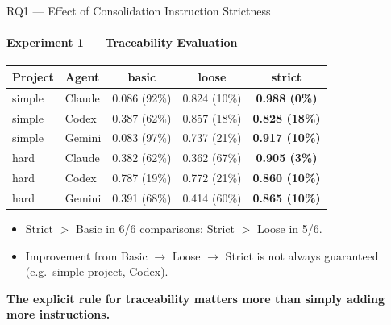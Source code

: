 \documentclass[aspectratio=169,11pt,c]{beamer}
\begin{document}
\begin{frame}{RQ1 --- Effect of Consolidation Instruction Strictness}
  \framesubtitle{Experiment 1 --- Traceability Evaluation}
  \begin{center}\scriptsize
  \begin{tabular}{llccc}
    \toprule
    \textbf{Project} & \textbf{Agent} & \textbf{basic} & \textbf{loose} & \textbf{strict} \\
    \midrule
    simple & Claude & 0.086 (92\%) & 0.824 (10\%) & \textbf{\textcolor{primaryblue}{0.988 (0\%)}} \\
    simple & Codex & 0.387 (62\%) & 0.857 (18\%) & \textbf{\textcolor{primaryblue}{0.828 (18\%)}} \\
    simple & Gemini & 0.083 (97\%) & 0.737 (21\%) & \textbf{\textcolor{primaryblue}{0.917 (10\%)}} \\
    hard & Claude & 0.382 (62\%) & 0.362 (67\%) & \textbf{\textcolor{primaryblue}{0.905 (3\%)}} \\
    hard & Codex & 0.787 (19\%) & 0.772 (21\%) & \textbf{\textcolor{primaryblue}{0.860 (10\%)}} \\
    hard & Gemini & 0.391 (68\%) & 0.414 (60\%) & \textbf{\textcolor{primaryblue}{0.865 (10\%)}} \\
    \bottomrule
  \end{tabular}
  \end{center}
  \vspace{3pt}
  \begin{itemize}\scriptsize
    \item Strict $>$ Basic in 6/6 comparisons; Strict $>$ Loose in 5/6.
    \item Improvement from Basic $\to$ Loose $\to$ Strict is not always guaranteed (e.g.\ simple project, Codex).
  \end{itemize}
  \vspace{3pt}
  \begin{calloutbox}
    \small\textbf{The explicit rule for traceability matters more than simply adding more instructions.}
  \end{calloutbox}
\end{frame}
\end{document}
